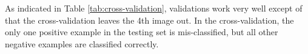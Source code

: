 As indicated in \mbox{Table} \ref{tab:cross-validation}, validations work very well except of that the cross-validation leaves the 4th image out. In the cross-validation, the only one positive example in the testing set is mis-classified, but all other negative examples are classified correctly. %

